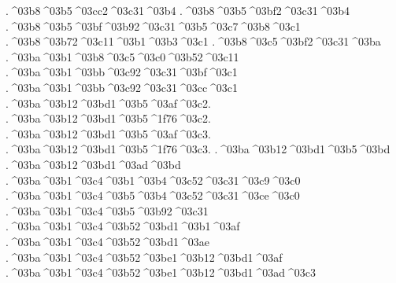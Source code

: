 {.^^^^03b8^^^^03b5^^^^03cc2^^^^03c31^^^^03b4   %
.^^^^03b8^^^^03b5^^^^03bf2^^^^03c31^^^^03b4
.^^^^03b8^^^^03b5^^^^03bf^^^^03b92^^^^03c31^^^^03b5^^^^03c7^^^^03b8^^^^03c1		%
.^^^^03b8^^^^03b72^^^^03c11^^^^03b1^^^^03b3^^^^03c1  		%
.^^^^03b8^^^^03c5^^^^03bf2^^^^03c31^^^^03ba     		%
.^^^^03ba^^^^03b1^^^^03b8^^^^03c5^^^^03c0^^^^03b52^^^^03c11 		%
.^^^^03ba^^^^03b1^^^^03bb^^^^03c92^^^^03c31^^^^03bf^^^^03c1 	 	%
.^^^^03ba^^^^03b1^^^^03bb^^^^03c92^^^^03c31^^^^03cc^^^^03c1
.^^^^03ba^^^^03b12^^^^03bd1^^^^03b5^^^^03af^^^^03c2.		%
.^^^^03ba^^^^03b12^^^^03bd1^^^^03b5^^^^1f76^^^^03c2.
.^^^^03ba^^^^03b12^^^^03bd1^^^^03b5^^^^03af^^^^03c3.
.^^^^03ba^^^^03b12^^^^03bd1^^^^03b5^^^^1f76^^^^03c3.
.^^^^03ba^^^^03b12^^^^03bd1^^^^03b5^^^^03bd
.^^^^03ba^^^^03b12^^^^03bd1^^^^03ad^^^^03bd		
.^^^^03ba^^^^03b1^^^^03c4^^^^03b1^^^^03b4^^^^03c52^^^^03c31^^^^03c9^^^^03c0 		%
.^^^^03ba^^^^03b1^^^^03c4^^^^03b5^^^^03b4^^^^03c52^^^^03c31^^^^03ce^^^^03c0  		%
.^^^^03ba^^^^03b1^^^^03c4^^^^03b5^^^^03b92^^^^03c31 		%
.^^^^03ba^^^^03b1^^^^03c4^^^^03b52^^^^03bd1^^^^03b1^^^^03af 		%
.^^^^03ba^^^^03b1^^^^03c4^^^^03b52^^^^03bd1^^^^03ae 		%
.^^^^03ba^^^^03b1^^^^03c4^^^^03b52^^^^03be1^^^^03b12^^^^03bd1^^^^03af 		%
.^^^^03ba^^^^03b1^^^^03c4^^^^03b52^^^^03be1^^^^03b12^^^^03bd1^^^^03ad^^^^03c3   	%
}
